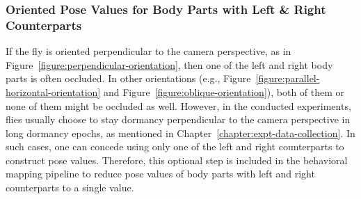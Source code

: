 \subsubsection{Oriented Pose Values for Body Parts with Left \& Right Counterparts}
If the fly is oriented perpendicular to the camera perspective, as in Figure~\ref{figure:perpendicular-orientation}, then one of the left and right body parts is often occluded.
In other orientations (e.g., Figure~\ref{figure:parallel-horizontal-orientation} and Figure~\ref{figure:oblique-orientation}),  both of them or none of them might be occluded as well.
However, in the conducted experiments, flies usually choose to stay dormancy perpendicular to the camera perspective in long dormancy epochs, as mentioned in Chapter~\ref{chapter:expt-data-collection}.
In such cases, one can concede using only one of the left and right counterparts to construct pose values.
Therefore, this optional step is included in the behavioral mapping pipeline to reduce pose values of body parts with left and right counterparts to a single value.

